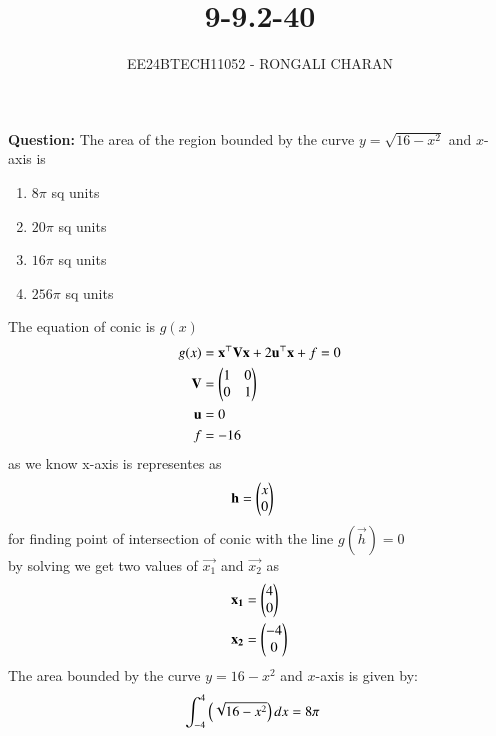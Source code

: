 \documentclass[journal,12pt,onecolumn]{IEEEtran}
\theoremstyle{remark}
\begin{document}

\vspace{3cm}
\title{9-9.2-40}
\author{EE24BTECH11052 - RONGALI CHARAN}
{\let\newpage\relax\maketitle}

\renewcommand{\thefigure}{\theenumi}
\renewcommand{\thetable}{\theenumi}
\setlength{\intextsep}{10pt} %


\renewcommand{\thetable}{\theenumi}
\textbf{Question:} The area of the region bounded by the curve $y=\sqrt{16-x^2}$ and $x$-axis is
\begin{enumerate}
\item $8\pi$ sq units
\item $20\pi$ sq units
\item $16\pi$ sq units
\item $256\pi$ sq units
\end{enumerate}
\solution
The equation of conic is $g(x)$
\begin{align}
	g(x) &= \mathbf{x}^\top \mathbf{V}\mathbf{x}+2\mathbf{u}^\top \mathbf{x}+f=0\\
	\mathbf{V} &= \begin{pmatrix}1 & 0\\0 & 1\end{pmatrix}\\
	\mathbf{u} &= 0 \\
	f &= -16
       \end{align}
       as we know x-axis is representes as 
\begin{align}
	\mathbf{h} &= \begin{pmatrix}x \\ 0\end{pmatrix}
\end{align}
for finding point of intersection of conic with the line $g(\vec{h})=0$\\
by solving we get two values of $\vec{x_1}$ and $\vec{x_2}$ as
\begin{align}
	\mathbf{x_1} &= \begin{pmatrix}4 \\0\end{pmatrix}\\
	\mathbf{x_2} &= \begin{pmatrix}-4\\0\end{pmatrix}
\end{align}
The area bounded by the curve $y = 16-x^2$ and $x$-axis is given by:
\begin{align}
	\int_{-4}^{4}\left(\sqrt{16-x^2} \right)dx &= 8\pi 
\end{align}
\end{document}
